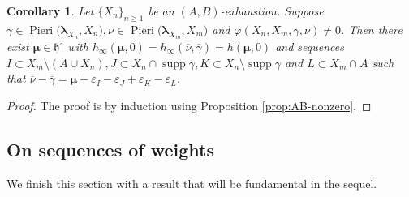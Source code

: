 \documentclass[11pt,fleqn]{amsart}
\renewcommand\phi{\varphi}
\renewcommand\epsilon{\varepsilon}
\newtheorem{cor}[thm]{Corollary}
\theoremstyle{definition}
\theoremstyle{remark}
\theoremstyle{remark}
\newcommand\lie[1]{\mathfrak{#1}}
\newcommand\wt[1]{\boldsymbol{#1}}
\DeclareMathOperator\supp{supp}
\newcommand\Pieri[2]{\operatorname{Pieri}{(#1},{#2)}}
\newcommand\map[4]{\phi(#3,#4,#1,#2)}
\begin{document}
\begin{cor}
\label{cor:AB-nonzero-maps}
Let $\{X_n\}_{n \geq 1}$ be an $(A,B)$-exhaustion. Suppose $\gamma \in 
\Pieri{\wt\lambda_{X_n}}{X_n}, \nu \in \Pieri{\wt\lambda_{X_m}}{X_m}$ and 
$\map{\gamma}{\nu}{X_n}{X_m} \neq 0$. Then there exist $\wt\mu \in \lie 
h^\circ$ with $h_\infty(\wt\mu,0) = h_\infty(\overline\nu,\overline\gamma)
= h(\wt\mu,0)$ and sequences $I \subset X_m \setminus (A \cup X_n), 
J \subset X_n \cap \supp \gamma, K \subset X_n \setminus \supp \gamma$ and 
$L \subset X_m \cap A$ such that $\overline \nu - \overline \gamma = \wt\mu + 
\epsilon_I - \epsilon_J + \epsilon_K - \epsilon_L$.
\end{cor}
\begin{proof}
The proof is by induction using Proposition \ref{prop:AB-nonzero}.
\end{proof}

\subsection{On sequences of weights}
We finish this section with a result that will be fundamental in the 
sequel. 
\end{document}
